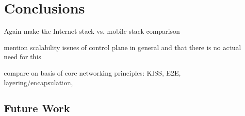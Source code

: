 \chapter{Conclusions}
\label{chap:conclusion}

Again make the Internet stack vs. mobile stack comparison

mention scalability issues of control plane in general and that there is no actual need for this

compare on basis of core networking principles: KISS, E2E, layering/encapsulation, 


\section{Future Work}
